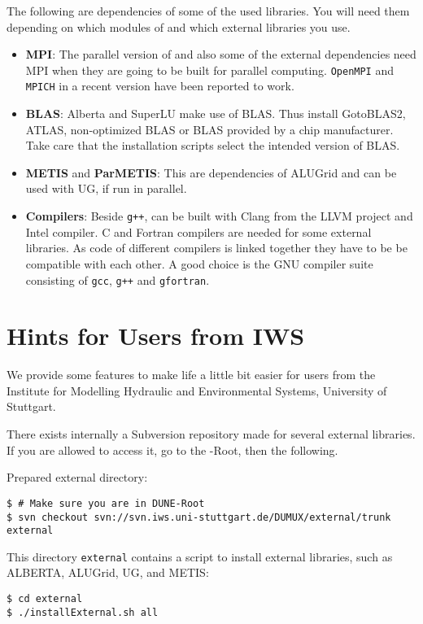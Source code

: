 The following are dependencies of some of the used libraries. You will need them depending on which modules of \Dune and which external libraries you use.

\begin{itemize}
\item \textbf{MPI}: The parallel version of \Dune and also some of the external dependencies need MPI
  when they are going to be built for parallel computing. \texttt{OpenMPI} and \texttt{MPICH} in a recent
  version have been reported to work.

\item \textbf{BLAS}: Alberta and SuperLU make use of BLAS. Thus install GotoBLAS2, ATLAS, non-optimized BLAS
  or BLAS provided by a chip manufacturer. Take care that the installation scripts select the intended
  version of BLAS.

\item \textbf{METIS} and \textbf{ParMETIS}: This are dependencies of ALUGrid and can be used with UG, if run in parallel.

\item \textbf{Compilers}: Beside \texttt{g++}, \Dune can be built with Clang from the LLVM project and
  Intel \Cplusplus compiler. C and Fortran compilers are needed for some external libraries. As code of
  different compilers is linked together they have to be be compatible with each other. A good choice
  is the GNU compiler suite consisting of \texttt{gcc}, \texttt{g++} and \texttt{gfortran}.
\end{itemize}

\section{Hints for Users from IWS}
We provide some features to make life a little bit easier for
users from the Institute for Modelling Hydraulic and Environmental Systems, University of Stuttgart.

There exists internally a Subversion repository made for several external libraries.
If you are allowed to access it, go to the {\Dune}-Root, then the following.

Prepared external directory:
\begin{lstlisting}[style=Bash]
$ # Make sure you are in DUNE-Root
$ svn checkout svn://svn.iws.uni-stuttgart.de/DUMUX/external/trunk external
\end{lstlisting}

This directory \texttt{external} contains a script to install external libraries, such as 
ALBERTA, ALUGrid, UG, and METIS:
\begin{lstlisting}[style=Bash]
$ cd external
$ ./installExternal.sh all
\end{lstlisting}

